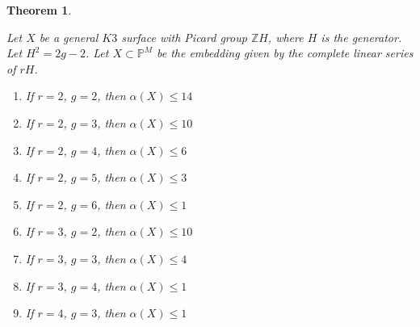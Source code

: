 \documentclass[11pt,twoside]{amsart}
\theoremstyle{plain}
\numberwithin{equation}{section}
\newtheorem{theorem}{Theorem}[section]
\theoremstyle{definition}
\begin{document}
\begin{theorem}\label{ZL for lower genus $K3$ surfaces}

Let $X$ be a general $K3$ surface with Picard group $\mathbb{Z}H$, where $H$ is the generator. Let $H^2 = 2g-2$. Let $X \subset \mathbb{P}^M$ be the embedding given by the complete linear series of $rH$. 
    \begin{enumerate}
        \item If $r = 2$, $g = 2$, then $\alpha(X) \leq 14$ 
        \item If $r = 2$, $g = 3$, then $\alpha(X) \leq 10$ %
        \item If $r = 2$, $g = 4$, then $\alpha(X) \leq 6$ 
        \item If $r = 2$, $g = 5$, then $\alpha(X) \leq 3$ 
        \item If $r = 2$, $g = 6$, then $\alpha(X) \leq 1$ 
        \item If $r = 3$, $g = 2$, then $\alpha(X) \leq 10$ %
        \item If $r = 3$, $g = 3$, then $\alpha(X) \leq 4$
        \item If $r = 3$, $g = 4$, then $\alpha(X) \leq 1$ 
        \item If $r = 4$, $g = 3$, then $\alpha(X) \leq 1$
        
       
        
    \end{enumerate}
    
\end{theorem}
\end{document}
